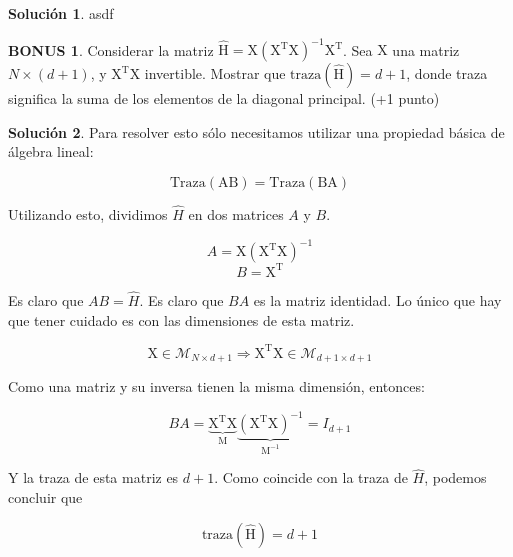 \documentclass[a4paper, 11pt]{article}
\theoremstyle{definition}
\newtheorem*{solucion}{Solución}
\newtheorem*{bonus}{BONUS}
\begin{document}
  \begin{solucion}
    asdf
  \end{solucion}

  \begin{bonus}
    Considerar la matriz $\hat{\mathrm{H}}=\mathrm{X(X^TX)^{-1}X^T}$. Sea $\mathrm{X}$ una matriz  $N\times (d+1)$, y $\mathrm{X^TX}$ invertible. Mostrar que $\mathrm{traza(\hat{H})}=d+1$, donde traza significa la suma de los elementos de la diagonal principal. (+1 punto)
  \end{bonus}

  \begin{solucion}
    Para resolver esto sólo necesitamos utilizar una propiedad básica de álgebra lineal:

    $$ \mathrm{Traza(AB)}=\mathrm{Traza(BA)}$$

    Utilizando esto, dividimos $\hat{H}$ en dos matrices $A$ y $B$.

    $$A = \mathrm{X(X^TX)^{-1}}$$
    $$B = \mathrm{X^T}$$

    Es claro que $AB=\hat{H}$. Es claro que $BA$ es la matriz identidad. Lo único que hay que tener cuidado es con las dimensiones de esta matriz.

    $$\mathrm{X} \in \mathcal{M}_{N \times d+1} \Rightarrow \mathrm{X^TX} \in \mathcal{M}_{d+1 \times d+1}$$

    Como una matriz y su inversa tienen la misma dimensión, entonces:

    $$BA=\mathrm{\underbrace{X^TX}_M\underbrace{(X^TX)^{-1}}_{M^{-1}}}=I_{d+1}$$

    Y la traza de esta matriz es $d+1$. Como coincide con la traza de $\hat{H}$, podemos concluir que

    $$\mathrm{traza(\hat{H})}=d+1$$
  \end{solucion}
\end{document}
